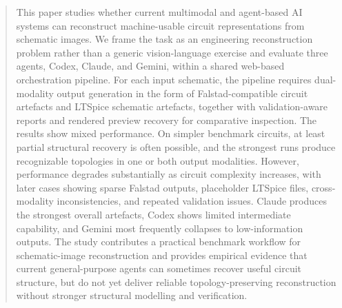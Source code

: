 \begin{abstract}
This paper studies whether current multimodal and agent-based AI systems can reconstruct machine-usable circuit representations from schematic images. We frame the task as an engineering reconstruction problem rather than a generic vision-language exercise and evaluate three agents, Codex, Claude, and Gemini, within a shared web-based orchestration pipeline. For each input schematic, the pipeline requires dual-modality output generation in the form of Falstad-compatible circuit artefacts and LTSpice schematic artefacts, together with validation-aware reports and rendered preview recovery for comparative inspection. The results show mixed performance. On simpler benchmark circuits, at least partial structural recovery is often possible, and the strongest runs produce recognizable topologies in one or both output modalities. However, performance degrades substantially as circuit complexity increases, with later cases showing sparse Falstad outputs, placeholder LTSpice files, cross-modality inconsistencies, and repeated validation issues. Claude produces the strongest overall artefacts, Codex shows limited intermediate capability, and Gemini most frequently collapses to low-information outputs. The study contributes a practical benchmark workflow for schematic-image reconstruction and provides empirical evidence that current general-purpose agents can sometimes recover useful circuit structure, but do not yet deliver reliable topology-preserving reconstruction without stronger structural modelling and verification.
\end{abstract}
